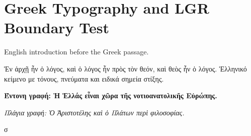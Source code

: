 \documentclass{article}
\begin{document}
\section{Greek Typography and LGR Boundary Test}

English introduction before the Greek passage.

\textgreek{
Ἐν ἀρχῇ ἦν ὁ λόγος, καὶ ὁ λόγος ἦν πρὸς τὸν θεόν, καὶ θεὸς ἦν ὁ λόγος.
Ἑλληνικό κείμενο με τόνους, πνεύματα και ειδικά σημεία στίξης.
}

\bigskip
\textgreek{\textbf{Έντονη γραφή: Ἡ Ἑλλάς εἶναι χῶρα τῆς νοτιοανατολικῆς Εὐρώπης.}}

\bigskip
\textgreek{\textit{Πλάγια γραφή: Ὁ Ἀριστοτέλης καὶ ὁ Πλάτων περὶ φιλοσοφίας.}}

\bigskip
\textgreek{
\noboundary σ\noboundary
}
\end{document}
